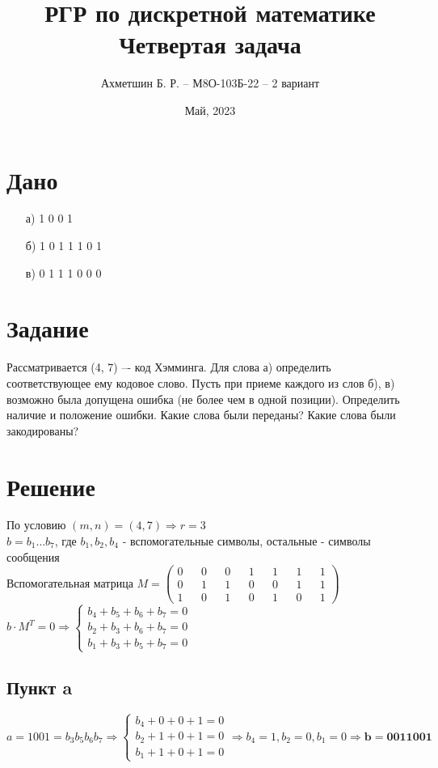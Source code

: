 \documentclass{article}
\title{РГР по дискретной математике\\Четвертая задача}
\author{Ахметшин Б. Р. -- М8О-103Б-22 -- 2 вариант}
\date{Май, 2023}
\begin{document}
\maketitle

\section*{Дано}
\begin{enumerate}
    \item[а)] 1 0 0 1
    \item[б)] 1 0 1 1 1 0 1
    \item[в)] 0 1 1 1 0 0 0
\end{enumerate}


\section*{Задание}
Рассматривается (4, 7) –- код Хэмминга. Для слова а) определить соответствующее ему
кодовое слово. Пусть при приеме каждого из слов б), в) возможно была допущена ошибка
(не более чем в одной позиции). Определить наличие и положение ошибки. Какие слова
были переданы? Какие слова были закодированы?


\section*{Решение}
По условию $(m, n) = (4, 7) \Rightarrow r = 3$
\\
$b = b_1\dots b_7$, где $b_1, b_2, b_4$ - вспомогательные символы, остальные - символы сообщения
\\
Вспомогательная матрица
$
M =
\begin{pmatrix}
    0 && 0 && 0 && 1 && 1 && 1 && 1 \\
    0 && 1 && 1 && 0 && 0 && 1 && 1 \\
    1 && 0 && 1 && 0 && 1 && 0 && 1
\end{pmatrix}
$
\\
$b \cdot M^T = 0 \Rightarrow
\begin{cases}
    b_4 + b_5 + b_6 + b_7 = 0 \\
    b_2 + b_3 + b_6 + b_7 = 0 \\
    b_1 + b_3 + b_5 + b_7 = 0
\end{cases}
$

\subsection*{Пункт a}
$a = 1001 = b_3b_5b_6b_7 \Rightarrow
\begin{cases}
    b_4 + 0 + 0 + 1 = 0 \\
    b_2 + 1 + 0 + 1 = 0 \\
    b_1 + 1 + 0 + 1 = 0
\end{cases} \Rightarrow
b_4 = 1, b_2 = 0, b_1 = 0 \Rightarrow
\mathbf{b = 0011001}
$
\end{document}
